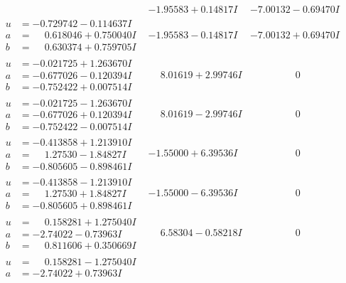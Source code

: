 \documentclass[1p]{elsarticle_modified}
\theoremstyle{definition}
\begin{document}
$$\begin{array}{c|c|c}
 & -1.95583 + 0.14817 I & -7.00132 - 0.69470 I \\ \hline\begin{aligned}
u &= -0.729742 - 0.114637 I \\
a &= \phantom{-}0.618046 + 0.750040 I \\
b &= \phantom{-}0.630374 + 0.759705 I\end{aligned}
 & -1.95583 - 0.14817 I & -7.00132 + 0.69470 I \\ \hline\begin{aligned}
u &= -0.021725 + 1.263670 I \\
a &= -0.677026 - 0.120394 I \\
b &= -0.752422 + 0.007514 I\end{aligned}
 & \phantom{-}8.01619 + 2.99746 I & \phantom{-0.000000 } 0 \\ \hline\begin{aligned}
u &= -0.021725 - 1.263670 I \\
a &= -0.677026 + 0.120394 I \\
b &= -0.752422 - 0.007514 I\end{aligned}
 & \phantom{-}8.01619 - 2.99746 I & \phantom{-0.000000 } 0 \\ \hline\begin{aligned}
u &= -0.413858 + 1.213910 I \\
a &= \phantom{-}1.27530 - 1.84827 I \\
b &= -0.805605 - 0.898461 I\end{aligned}
 & -1.55000 + 6.39536 I & \phantom{-0.000000 } 0 \\ \hline\begin{aligned}
u &= -0.413858 - 1.213910 I \\
a &= \phantom{-}1.27530 + 1.84827 I \\
b &= -0.805605 + 0.898461 I\end{aligned}
 & -1.55000 - 6.39536 I & \phantom{-0.000000 } 0 \\ \hline\begin{aligned}
u &= \phantom{-}0.158281 + 1.275040 I \\
a &= -2.74022 - 0.73963 I \\
b &= \phantom{-}0.811606 + 0.350669 I\end{aligned}
 & \phantom{-}6.58304 - 0.58218 I & \phantom{-0.000000 } 0 \\ \hline\begin{aligned}
u &= \phantom{-}0.158281 - 1.275040 I \\
a &= -2.74022 + 0.73963 I \\

\end{aligned}
\end{array}$$
\end{document}
